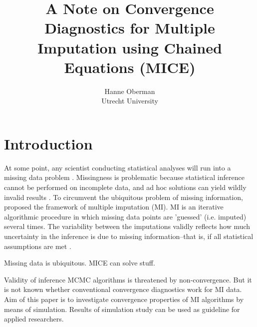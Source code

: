 \documentclass[article]{jss}
\author{Hanne Oberman\\Utrecht University}
\title{A Note on Convergence Diagnostics for Multiple Imputation using Chained Equations (MICE)}
\begin{document}

\section{Introduction} \label{sec:intro} %

At some point, any scientist conducting statistical analyses will run into a missing data problem \citep{alli02}. Missingness is problematic because statistical inference cannot be performed on incomplete data, and  ad hoc solutions can yield wildly invalid results \citep{buur18}. To circumvent the ubiquitous problem of missing information, \cite{rubin87} proposed the framework of multiple imputation (MI). MI is an iterative algorithmic procedure in which missing data points are 'guessed' (i.e. imputed) several times. The variability between the imputations validly reflects how much uncertainty in the inference is due to missing information--that is, if all statistical assumptions are met \cite{rubin87}.

Missing data is ubiquitous. MICE can solve stuff. 

Validity of inference MCMC algorithms is threatened by non-convergence. But it is not known whether conventional convergence diagnostics work for MI data. Aim of this paper is to investigate convergence properties of MI algorithms by means of simulation. Results of simulation study can be used as guideline for applied researchers. %

\end{document}

